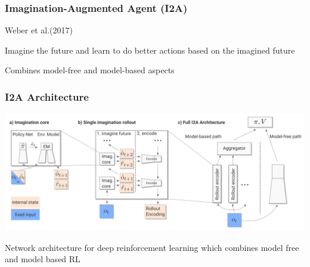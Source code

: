 
\PraesentationMasterWeissBlau 
\begin{frame} 

\end{frame} 

\PraesentationMasterStandard


\begin{frame}
    \frametitle{Imagination-Augmented Agent (I2A)}

\begin{PraesentationAufzaehlung}
	\item Weber et al.(2017)
    \item Imagine the future and learn to do better actions based on the imagined future
    \item Combines model-free and model-based aspects
\end{PraesentationAufzaehlung}

\end{frame}
\clearpage

\begin{frame}
    \frametitle{I2A Architecture}


\includegraphics[width=\columnwidth]{./Images/i2a_architecture.png}%
\begin{PraesentationAufzaehlung}
\item Network architecture for deep reinforcement learning which combines model free and model based RL
\end{PraesentationAufzaehlung}
    
\end{frame}
\clearpage

